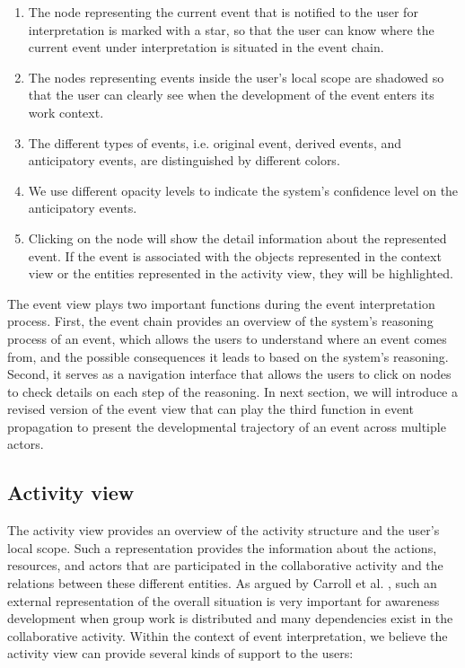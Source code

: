 \begin{enumerate}
	\item The node representing the current event that is notified to the user for interpretation is marked with a star, so that the user can know where the current event under interpretation is situated in the event chain.
	\item The nodes representing events inside the user's local scope are shadowed so that the user can clearly see when the development of the event enters its work context.
	\item The different types of events, i.e. original event, derived events, and anticipatory events, are distinguished by different colors.
	\item We use different opacity levels to indicate the system's confidence level on the anticipatory events.
	\item Clicking on the node will show the detail information about the represented event. If the event is associated with the objects represented in the context view or the entities represented in the activity view, they will be highlighted.
\end{enumerate}
 
 The event view plays two important functions during the event interpretation process. First, the event chain provides an overview of the system's reasoning process of an event, which allows the users to understand where an event comes from, and the possible consequences it leads to based on the system's reasoning. Second, it serves as a navigation interface that allows the users to click on nodes to check details on each step of the reasoning. In next section, we will introduce a revised version of the event view that can play the third function in event propagation to present the developmental trajectory of an event across multiple actors.

\subsection{Activity view} %
\label{sub:activity_view}
The activity view provides an overview of the activity structure and the user's local scope. Such a representation provides the information about the actions, resources, and actors that are participated in the collaborative activity and the relations between these different entities. As argued by Carroll et al. \cite{carroll2003a}, such an external representation of the overall situation is very important for awareness development when group work is distributed and many dependencies exist in the collaborative activity. Within the context of event interpretation, we believe the activity view can provide several kinds of support to the users:

